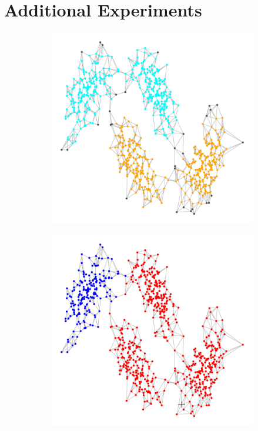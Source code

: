 \documentclass{article}
\newcommand{\1}{\mathbf{1}}
\theoremstyle{aldenthm}
\begin{document}
\section{Additional Experiments}

\begin{figure}
	\centering
	\begin{adjustbox}{minipage=\linewidth,scale=0.8}
		\begin{subfigure}{.24\linewidth}
			\includegraphics[width=\linewidth,scale = .5]{example3plots/true_density_cluster}
			\caption{}
		\end{subfigure}
		\begin{subfigure}{.24\linewidth}
			\includegraphics[width=\linewidth,scale = .5]{example3plots/ppr_cluster}

\end{subfigure}
\end{adjustbox}
\end{figure}
\end{document}
